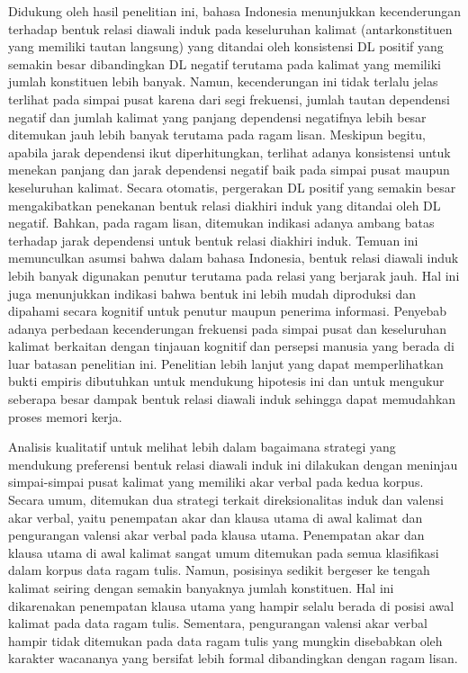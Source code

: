 Didukung oleh hasil penelitian ini, bahasa Indonesia menunjukkan kecenderungan terhadap bentuk relasi diawali induk pada keseluruhan kalimat (antarkonstituen yang memiliki tautan langsung) yang ditandai oleh konsistensi DL positif yang semakin besar dibandingkan DL negatif terutama pada kalimat yang memiliki jumlah konstituen lebih banyak. Namun, kecenderungan ini tidak terlalu jelas terlihat pada simpai pusat karena dari segi frekuensi, jumlah tautan dependensi negatif dan jumlah kalimat yang panjang dependensi negatifnya lebih besar ditemukan jauh lebih banyak terutama pada ragam lisan. Meskipun begitu, apabila jarak dependensi ikut diperhitungkan, terlihat adanya konsistensi untuk menekan panjang dan jarak dependensi negatif baik pada simpai pusat maupun keseluruhan kalimat. Secara otomatis, pergerakan DL positif yang semakin besar mengakibatkan penekanan bentuk relasi diakhiri induk yang ditandai oleh DL negatif. Bahkan, pada ragam lisan, ditemukan indikasi adanya ambang batas terhadap jarak dependensi untuk bentuk relasi diakhiri induk. Temuan ini memunculkan asumsi bahwa dalam bahasa Indonesia, bentuk relasi diawali induk lebih banyak digunakan penutur terutama pada relasi yang berjarak jauh. Hal ini juga menunjukkan indikasi bahwa bentuk ini lebih mudah diproduksi dan dipahami secara kognitif untuk penutur maupun penerima informasi. Penyebab adanya perbedaan kecenderungan frekuensi pada simpai pusat dan keseluruhan kalimat berkaitan dengan tinjauan kognitif dan persepsi manusia yang berada di luar batasan penelitian ini. Penelitian lebih lanjut yang dapat memperlihatkan bukti empiris dibutuhkan untuk mendukung hipotesis ini dan untuk mengukur seberapa besar dampak bentuk relasi diawali induk sehingga dapat memudahkan proses memori kerja. 

Analisis kualitatif untuk melihat lebih dalam bagaimana strategi yang mendukung preferensi bentuk relasi diawali induk ini dilakukan dengan meninjau simpai-simpai pusat kalimat yang memiliki akar verbal pada kedua korpus. Secara umum, ditemukan dua strategi terkait direksionalitas induk dan valensi akar verbal, yaitu penempatan akar dan klausa utama di awal kalimat dan pengurangan valensi akar verbal pada klausa utama. Penempatan akar dan klausa utama di awal kalimat sangat umum ditemukan pada semua klasifikasi dalam korpus data ragam tulis. Namun, posisinya sedikit bergeser ke tengah kalimat seiring dengan semakin banyaknya jumlah konstituen. Hal ini dikarenakan penempatan klausa utama yang hampir selalu berada di posisi awal kalimat pada data ragam tulis. Sementara, pengurangan valensi akar verbal hampir tidak ditemukan pada data ragam tulis yang mungkin disebabkan oleh karakter wacananya yang bersifat lebih formal dibandingkan dengan ragam lisan. 


